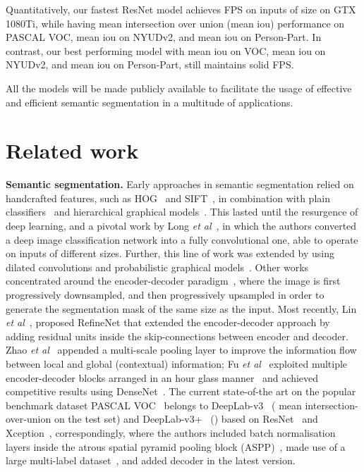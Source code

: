 \documentclass{bmvc2k}
\def\etal{\emph{et al}\bmvaOneDot}
\begin{document}
Quantitatively, our fastest ResNet model achieves  FPS on inputs of size  on GTX 1080Ti, while having  mean intersection over union (mean iou) performance on PASCAL VOC,  mean iou on NYUDv2, and  mean iou on Person-Part. In contrast, our best performing model with  mean iou on VOC,  mean iou on NYUDv2, and  mean iou on Person-Part, still maintains solid  FPS.\par
	All the models will be made publicly available to facilitate the usage of effective and efficient semantic segmentation in a multitude of applications.
\vspace{-0.12in}

\section{Related work}
\vskip -0.1in
\textbf{Semantic segmentation.} Early approaches in semantic segmentation relied on handcrafted features, such as HOG~\cite{DalalT05} and SIFT~\cite{Lowe04}, in combination with plain classifiers~\cite{ShottonWRC06,CsurkaP08,ShottonJC08,FulkersonVS09} and hierarchical graphical models~\cite{LadickyRKT09,PlathTN09,KrahenbuhlK11}. This lasted until the resurgence of deep learning, and a pivotal work by Long \etal~\cite{LongSD15}, in which the authors converted a deep image classification network into a fully convolutional one, able to operate on inputs of different sizes. Further, this line of work was extended by using dilated convolutions and probabilistic graphical models~\cite{ChenPKMY14,YuKF17,LinSRH15,LiuLLLT15,ZhengJRVSDHT15}. Other works concentrated around the encoder-decoder paradigm~\cite{LinMSR17,PaszkeCKC16,NohHH15}, where the image is first progressively downsampled, and then progressively upsampled in order to generate the segmentation mask of the same size as the input. Most recently, Lin \etal~\cite{LinMSR17}, proposed RefineNet that extended the encoder-decoder approach by adding residual units inside the skip-connections between encoder and decoder. Zhao \etal~\cite{ZhaoSQWJ17} appended a multi-scale pooling layer to improve the information flow between local and global (contextual) information; Fu \etal~\cite{abs-1708-04943} exploited multiple encoder-decoder blocks arranged in an hour glass manner~\cite{YangLZ17} and achieved competitive results using DenseNet~\cite{HuangLMW17}. The current state-of-the art on the popular benchmark dataset PASCAL VOC~\cite{EveringhamGWWZ10} belongs to DeepLab-v3~\cite{ChenPSA17} ( mean intersection-over-union on the test set) and DeepLab-v3+~\cite{abs-1802-02611} () based on ResNet~\cite{HeZRS16} and Xception~\cite{Chollet17}, correspondingly, where the authors included batch normalisation~\cite{IoffeS15} layers inside the atrous spatial pyramid pooling block (ASPP)~\cite{ChenPK0Y16}, made use of a large multi-label dataset~\cite{SunSSG17}, and added decoder in the latest version.\\
\end{document}
